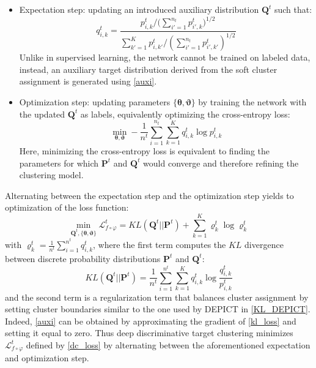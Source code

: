 \documentclass[runningheads]{llncs}
\begin{document}
\begin{itemize}
  \item Expectation step: updating an introduced auxiliary distribution $\boldsymbol{Q}^t$ such that:
\begin{equation}
q^t_{i,k} = \frac{{p^t_{i,k}}/({\sum_{i'=1}^{n_t} p^t_{i',k})^{1/2}}}{{\sum_{k'=1}^{K} p^t_{i,k'}}/{(\sum_{i'=1}^{n_t} p^t_{i',k'})^{1/2}}}
\label{auxi}
\end{equation}
Unlike in supervised learning, the network cannot be trained on labeled data, instead, an auxiliary target distribution derived from the soft cluster assignment is generated using \eqref{auxi}.
  
  \item Optimization step: updating parameters $\{\boldsymbol{\theta},\boldsymbol{\vartheta}\}$ by training the network with the updated $\boldsymbol{Q}^t$ as labels, equivalently optimizing the cross-entropy loss:
\begin{equation}
\min\limits_{\boldsymbol{\theta}, \boldsymbol{\vartheta}}- \frac{1}{n^t}\sum_{i=1}^{n_t}\sum_{k=1}^{K}q^t_{i,k}\log{p}^t_{i,k}
\label{ce_loss}
\end{equation}
Here, minimizing the cross-entropy loss is equivalent to finding the parameters for which $\boldsymbol{P}^t$ and $\boldsymbol{Q}^t$ would converge and therefore refining the clustering model.
\end{itemize}
Alternating between the expectation step and the optimization step yields to optimization of the loss function:
\begin{equation}
\min\limits_{\boldsymbol{Q}^t,\{{\boldsymbol{\theta}, \boldsymbol{\vartheta}\}}}\mathcal{L}_{f \circ \varphi}^t = KL(\boldsymbol{Q}^t||\boldsymbol{P}^t) + \sum_{k=1}^{K} \varrho_k^t \log\varrho_k^t
\label{dc_loss}
\end{equation}
with $\varrho_k^t = \frac{1}{n^t} \sum_{i=1}^{n^t} q_{i,k}^t$, where the first term computes the  $KL$ divergence between discrete probability distributions $\boldsymbol{P}^t$ and $\boldsymbol{Q}^t$:
\begin{equation}
KL(\boldsymbol{Q}^t||\boldsymbol{P}^t) = \frac{1}{n^t}\sum_{i=1}^{n^t}\sum_{k=1}^{K}q_{i,k}^t \log \frac{q_{i,k}^t}{p_{i,k}^t}
\label{kl_loss}
\end{equation}
and the second term is a regularization term that balances cluster assignment by setting cluster boundaries similar to the one used by DEPICT in \eqref{KL_DEPICT}. Indeed, \eqref{auxi} can be obtained by approximating the gradient of \eqref{kl_loss} and setting it equal to zero\cite{15}. Thus deep discriminative target clustering minimizes $\mathcal{L}_{f \circ \varphi}^t$ defined by \eqref{dc_loss} by alternating between the aforementioned expectation and optimization step.
\end{document}
